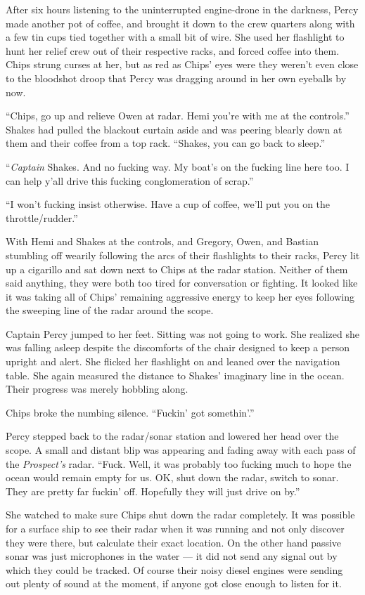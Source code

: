 \documentclass[]{scrbook}
\begin{document}
After six hours listening to the uninterrupted engine-drone in the
darkness, Percy made another pot of coffee, and brought it down to the
crew quarters along with a few tin cups tied together with a small bit
of wire. She used her flashlight to hunt her relief crew out of their
respective racks, and forced coffee into them. Chips strung curses at
her, but as red as Chips' eyes were they weren't even close to the
bloodshot droop that Percy was dragging around in her own eyeballs by
now.

``Chips, go up and relieve Owen at radar. Hemi you're with me at the
controls.'' Shakes had pulled the blackout curtain aside and was peering
blearly down at them and their coffee from a top rack. ``Shakes, you can
go back to sleep.''

``\emph{Captain} Shakes. And no fucking way. My boat's on the fucking
line here too. I can help y'all drive this fucking conglomeration of
scrap.''

``I won't fucking insist otherwise. Have a cup of coffee, we'll put you
on the throttle/rudder.''

With Hemi and Shakes at the controls, and Gregory, Owen, and Bastian
stumbling off wearily following the arcs of their flashlights to their
racks, Percy lit up a cigarillo and sat down next to Chips at the radar
station. Neither of them said anything, they were both too tired for
conversation or fighting. It looked like it was taking all of Chips'
remaining aggressive energy to keep her eyes following the sweeping line
of the radar around the scope.

Captain Percy jumped to her feet. Sitting was not going to work. She
realized she was falling asleep despite the discomforts of the chair
designed to keep a person upright and alert. She flicked her flashlight
on and leaned over the navigation table. She again measured the distance
to Shakes' imaginary line in the ocean. Their progress was merely
hobbling along.

Chips broke the numbing silence. ``Fuckin' got somethin'.''

Percy stepped back to the radar/sonar station and lowered her head over
the scope. A small and distant blip was appearing and fading away with
each pass of the \emph{Prospect's} radar. ``Fuck. Well, it was probably
too fucking much to hope the ocean would remain empty for us. OK, shut
down the radar, switch to sonar. They are pretty far fuckin' off.
Hopefully they will just drive on by.''

She watched to make sure Chips shut down the radar completely. It was
possible for a surface ship to see their radar when it was running and
not only discover they were there, but calculate their exact location.
On the other hand passive sonar was just microphones in the water --- it
did not send any signal out by which they could be tracked. Of course
their noisy diesel engines were sending out plenty of sound at the
moment, if anyone got close enough to listen for it.
\end{document}

